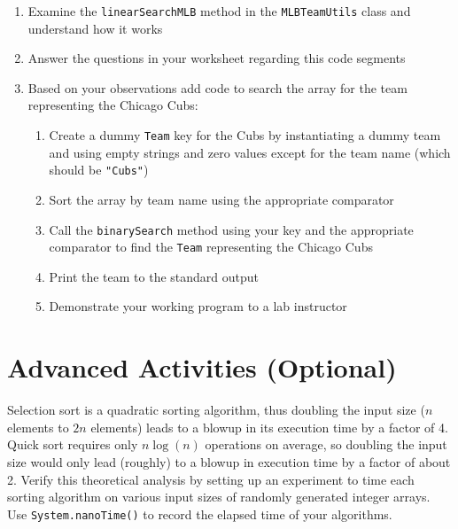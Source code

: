 \documentclass[12pt]{scrartcl}
\begin{document}
\begin{enumerate}
  \item Examine the \texttt{linearSearchMLB} method in the 
  	\texttt{MLBTeamUtils} class and understand how it works
  \item Answer the questions in your worksheet regarding this code segments
  \item Based on your observations add code to search the array for the team 
	representing the Chicago Cubs:
  \begin{enumerate}
    \item Create a dummy \texttt{Team} key for the Cubs by instantiating 
  	a dummy team and using empty strings and zero values except for 
	the team name (which should be \texttt{"Cubs"})
    \item Sort the array by team name using the appropriate comparator
    \item Call the \texttt{binarySearch} method using your key and 
	the appropriate comparator to find the \texttt{Team} representing 
	the Chicago Cubs
    \item Print the team to the standard output
    \item Demonstrate your working program to a lab instructor
  \end{enumerate}
\end{enumerate}
	
\section{Advanced Activities (Optional)}

Selection sort is a quadratic sorting algorithm, thus doubling the input size 
($n$ elements to $2n$ elements) leads to a blowup in its execution time 
by a factor of 4.  Quick sort requires only $n\log(n)$ operations on average, 
so doubling the input size would only lead (roughly) to a blowup in execution 
time by a factor of about 2.  Verify this theoretical analysis by setting up an 
experiment to time each sorting algorithm on various input sizes of randomly 
generated integer arrays.  Use \texttt{System.nanoTime()} to 
record the elapsed time of your algorithms.
	
\end{document}

